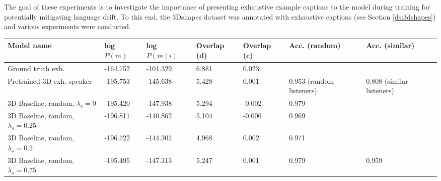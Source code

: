 The goal of these experiments is to investigate the importance of presenting exhaustive example captions to the model during training for potentially mitigating language drift. To this end, the 3Dshapes dataset was annotated with exhaustive captions (see Section \ref{ds:3dshapes}) and various experiments were conducted. %

\begin{table}[] 
	\begin{tabularx}{\textwidth}{|X|l|l|X|X|X|X|}
		\hline
		\textbf{Model name}                                    & \textbf{log $P(m)$} & \textbf{log $P(m \mid i)$} & \textbf{Overlap (d)} & \textbf{Overlap (c)} & \textbf{Acc. (random)} & \textbf{Acc. (similar)} \\ \hline
		Ground truth exh.       &      -164.752            &         -101.329               &       6.881             &      0.023               &                 &                \\ \hline
		Pretrained 3D exh. speaker                            &       -195.753            &         -145.638               &        5.428              &      0.001                & 0.953 (random listeners)                 & 0.808 (similar listeners)                 \\ \hline
		3D Baseline, random, $\lambda_s = 0$ &       -195.420            &    -147.938                    &           5.294            &      -0.002                &                 0.979                         &                                           \\ \hline
		3D Baseline, random, $\lambda_s = 0.25$     &     -196.811              &       -140.862                 &          5.104            &       -0.006               &          0.969                                &                                           \\ \hline
		3D Baseline, random, $\lambda_s = 0.5$   &         -196.722          &        -144.301                &        4.968              &          0.002            &                  0.971                      &                                           \\ \hline
		3D Baseline, random, $\lambda_s = 0.75$  &       -195.495        &           -147.313           &          5.247            &         0.001             & 0.979                                    &                        0.959                   \\ \hline

\end{tabularx}
\end{table}
